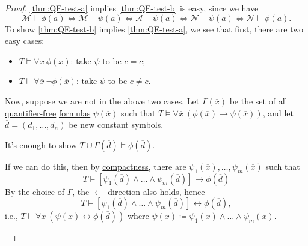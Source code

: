 \begin{proof}
	\autoref{thm:QE-test-a} implies \autoref{thm:QE-test-b} is easy, since we have
	\[
		\mathcal{M} \models \phi (\overline{a} )
		\iff \mathcal{M} \models \psi (\overline{a} )
		\iff \mathcal{A} \models \psi (\overline{a} )
		\iff \mathcal{N} \models \psi (\overline{a} )
		\iff \mathcal{N} \models \phi (\overline{a} ).
	\]
	To show \autoref{thm:QE-test-b} implies \autoref{thm:QE-test-a}, we see that first, there are two easy cases:
	\begin{itemize}
		\item \(T \models \forall \overline{x} \ \phi (\overline{x} )\): take \(\psi \) to be \(c = c\);
		\item \(T \models \forall \overline{x} \ \lnot \phi (\overline{x} )\): take \(\psi \) to be \(c \neq c\).
	\end{itemize}
	Now, suppose we are not in the above two cases. Let \(\Gamma (\overline{x} )\) be the set of all \hyperref[not:quantifier-free]{quantifier-free} \hyperref[def:formula]{formulas} \(\psi (\overline{x} )\) such that \(T \models \forall \overline{x} \ (\phi (\overline{x} ) \to \psi (\overline{x} ))\), and let \(\overline{d} = (d_1, \dots , d_n)\) be new constant symbols.
	\begin{claim}
		It's enough to show \(T \cup \Gamma (\overline{d} ) \models \phi (\overline{d} )\).
	\end{claim}
	\begin{explanation}
		If we can do this, then by \hyperref[thm:compactness]{compactness}, there are \(\psi _1(\overline{x}) , \dots , \psi _m(\overline{x} )\) such that
		\[
			T \models \left[ \psi _1(\overline{d} ) \land \dots \land \psi _m(\overline{d} ) \right] \to \phi (\overline{d} )
		\]
		By the choice of \(\Gamma \), the \(\gets\) direction also holds, hence
		\[
			T \models \left[ \psi _1(\overline{d} ) \land \dots \land \psi _m(\overline{d} ) \right] \leftrightarrow \phi (\overline{d} ),
		\]
		i.e., \(T \models \forall \overline{x} \ (\psi (\overline{x} ) \leftrightarrow \phi (\overline{d} ))\) where \(\psi (x) \coloneqq \psi _1(\overline{x} ) \land \dots \land \psi _m(\overline{x} )\).
	\end{explanation}


\end{proof}
